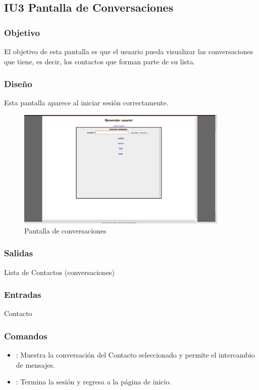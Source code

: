	\subsection{IU3 Pantalla de Conversaciones}

\subsubsection{Objetivo}
	El objetivo de esta pantalla es que el usuario pueda visualizar las conversaciones que tiene, es decir, los contactos que forman parte de su lista.

\subsubsection{Dise\~no}
	Esta pantalla aparece al iniciar sesi\'on correctamente.

	\begin{figure}[htbp!]
		\centering
			\includegraphics[width=0.9\textwidth]{images/Modulo1/Conversaciones}
		\caption{Pantalla de conversaciones}
	\end{figure}

\subsubsection{Salidas}
Lista de Contactos (conversaciones)


\subsubsection{Entradas}
\begin{Citemize}


\item Contacto
\end{Citemize}
\subsubsection{Comandos}
\begin{itemize}
			\item {}: Muestra la conversaci\'on del Contacto seleccionado y permite el intercambio de mensajes.
			\item {}: Termina la sesi\'on y regresa a la p\'agina de inicio.
	\end{itemize}

